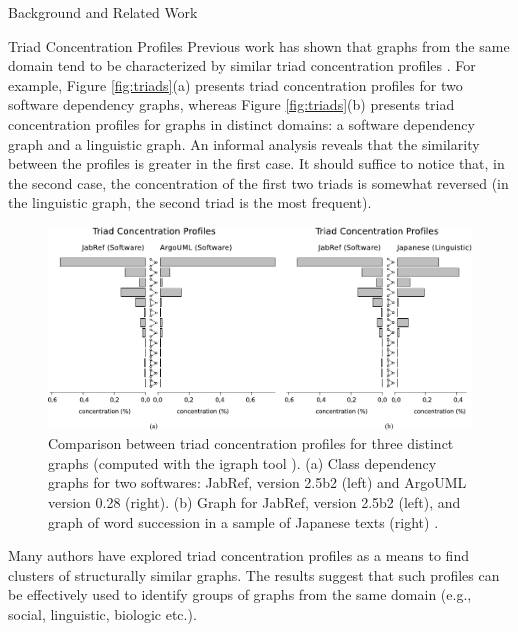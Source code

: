 \documentclass[11pt,twocolumn,a4paper,english]{article}
\begin{document}
\begin{section}{Background and Related Work}
\begin{subsection}{Triad Concentration Profiles}
		Previous work has shown that graphs from the same domain tend to be characterized by similar triad concentration profiles \cite{Milo2002}. For example, Figure \ref{fig:triads}(a) presents triad concentration profiles for two software dependency graphs, whereas Figure \ref{fig:triads}(b) presents triad concentration profiles for graphs in distinct domains: a software dependency graph and a linguistic graph. An informal analysis reveals that the similarity between the profiles is greater in the first case. It should suffice to notice that, in the second case, the concentration of the first two triads is somewhat reversed (in the linguistic graph, the second triad is the most frequent).

		\begin{figure}[htbp]
			\centering
				\includegraphics[scale=1]{figures/tcp}
			\caption{Comparison between triad concentration profiles for three distinct graphs (computed with the igraph tool \cite{igraph}). (a) Class dependency graphs for two softwares: JabRef, version 2.5b2 (left) and ArgoUML version 0.28 (right). (b) Graph for JabRef, version 2.5b2 (left), and graph of word succession in a sample of Japanese texts (right) \cite{Milo2004}.}
			\label{fig:tcp}
		\end{figure}

		Many authors \cite{Milo2004,Ma2007,Lin2008} have explored triad concentration profiles as a means to find clusters of structurally similar graphs. The results suggest that such profiles can be effectively used to identify groups of graphs from the same domain (e.g., social, linguistic, biologic etc.).

	\end{subsection}

	
\end{section}

\end{document}
